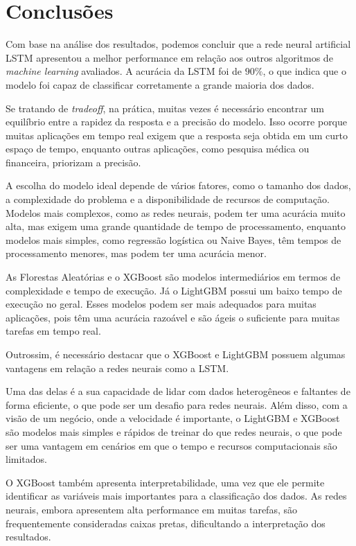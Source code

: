 \section{Conclusões}
\label{sec:conclu}

Com base na análise dos resultados, podemos concluir que a rede neural artificial LSTM apresentou a melhor performance em relação aos outros algoritmos de \textit{machine learning} avaliados. A acurácia da LSTM foi de $90\%$, o que indica que o modelo foi capaz de classificar corretamente a grande maioria dos dados.

Se tratando de \textit{tradeoff}, na prática, muitas vezes é necessário encontrar um equilíbrio entre a rapidez da resposta e a precisão do modelo. Isso ocorre porque muitas aplicações em tempo real exigem que a resposta seja obtida em um curto espaço de tempo, enquanto outras aplicações, como pesquisa médica ou financeira, priorizam a precisão.

A escolha do modelo ideal depende de vários fatores, como o tamanho dos dados, a complexidade do problema e a disponibilidade de recursos de computação. Modelos mais complexos, como as redes neurais, podem ter uma acurácia muito alta, mas exigem uma grande quantidade de tempo de processamento, enquanto modelos mais simples, como regressão logística ou Naive Bayes, têm tempos de processamento menores, mas podem ter uma acurácia menor.

As Florestas Aleatórias e o XGBoost são modelos intermediários em termos de complexidade e tempo de execução. Já o LightGBM possui um baixo tempo de execução no geral. Esses modelos podem ser mais adequados para muitas aplicações, pois têm uma acurácia razoável e são ágeis o suficiente para muitas tarefas em tempo real.

Outrossim, é necessário destacar que o XGBoost e LightGBM possuem algumas vantagens em relação a redes neurais como a LSTM.

Uma das delas é a sua capacidade de lidar com dados heterogêneos e faltantes de forma eficiente, o que pode ser um desafio para redes neurais. Além disso, com a visão de um negócio, onde a velocidade é importante, o LightGBM e XGBoost são modelos mais simples e rápidos de treinar do que redes neurais, o que pode ser uma vantagem em cenários em que o tempo e recursos computacionais são limitados.

O XGBoost também apresenta interpretabilidade, uma vez que ele permite identificar as variáveis mais importantes para a classificação dos dados. As redes neurais, embora apresentem alta performance em muitas tarefas, são frequentemente consideradas caixas pretas, dificultando a interpretação dos resultados.

